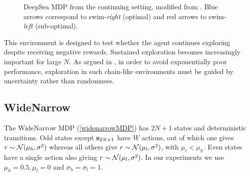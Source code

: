 \documentclass{article}
\begin{document}
\begin{appendices}
\begin{figure}[h!]
\caption[DeepSea MDP]{DeepSea MDP from the continuing setting, modified from \cite{deepsea}. Blue arrows correspond to swim-\textit{right} (optimal) and red arrows to swim-\textit{left} (sub-optimal).}\label{deepseaMDP}
\end{figure}
This environment is designed to test whether the agent continues exploring despite receiving negative rewards. Sustained exploration becomes increasingly important for large $N$. As argued in \cite{iothesis}, in order to avoid exponentially poor performance, exploration in such chain-like environments must be guided by uncertainty rather than randomness.

\subsection{WideNarrow}

The WideNarrow MDP (\cref{widenarrowMDP}) has $2N + 1$ states and deterministic transitions. Odd states except $\mathbf{s}_{2N + 1}$ have $W$ actions, out of which one gives $r \sim \mathcal{N}(\mu_h, \sigma^2)$ whereas all others give $r \sim \mathcal{N}(\mu_l, \sigma^2)$, with $\mu_l < \mu_h$. Even states have a single action also giving $r \sim \mathcal{N}(\mu_l, \sigma^2)$. In our experiments we use $\mu_h = 0.5, \mu_l = 0$ and $\sigma_h = \sigma_l = 1$.

\begin{figure}[h!]
\centering
{}
\end{figure}
\end{appendices}
\end{document}
